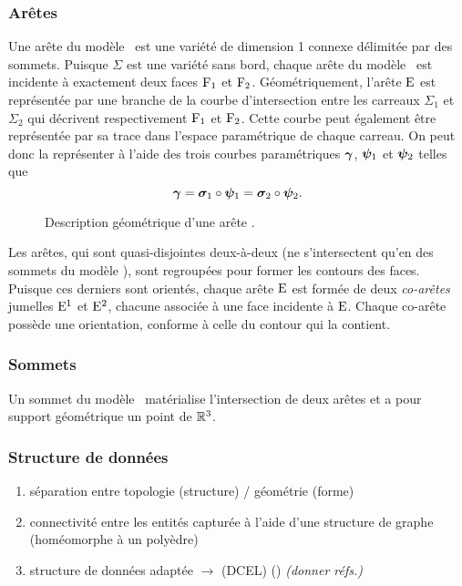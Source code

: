 \subsubsection{Arêtes}
\label{section:def_brep_edges}
Une arête du modèle \brep\ est une variété de dimension 1 connexe délimitée par des sommets.
Puisque $\Sigma$ est une variété sans bord, chaque arête du modèle \brep\ est incidente à exactement deux faces $\mathrm{F}_1$ et $\mathrm{F}_2$. 
Géométriquement, l'arête $\mathrm{E}$ est représentée par une branche de la courbe d'intersection entre les carreaux $\Sigma_1$ et $\Sigma_2$ qui décrivent respectivement $\mathrm{F}_1$ et $\mathrm{F}_2$. 
Cette courbe peut également être représentée par sa trace dans l'espace paramétrique de chaque carreau. 
On peut donc la représenter à l'aide des trois courbes paramétriques $\bm{\gamma}$, $\bm{\psi}_1$ et $\bm{\psi}_2$ telles que
\begin{equation}
	\bm{\gamma} = \bm{\sigma}_1 \circ \bm{\psi}_1 = \bm{\sigma}_2 \circ \bm{\psi}_2.
\end{equation}

\begin{figure}
	\centering
	
	\caption{Description géométrique d'une arête \brep.}
\end{figure}

Les arêtes, qui sont quasi-disjointes deux-à-deux (\ie ne s'intersectent qu'en des sommets du modèle \brep), sont regroupées pour former les contours des faces. 
Puisque ces derniers sont orientés, chaque arête $\mathrm{E}$ est formée de deux \textit{co-arêtes} jumelles $\mathrm{E}^1$ et $\mathrm{E}^2$, chacune associée à une face incidente à $\mathrm{E}$. 
Chaque co-arête possède une orientation, conforme à celle du contour qui la contient.


\subsubsection{Sommets}
\label{section:def_brep_vertices}
Un sommet du modèle \brep\ matérialise l'intersection de deux arêtes et a pour support géométrique un point de $\mathbb{R}^3$.

\subsubsection{Structure de données}
\begin{enumerate}
	\item séparation entre topologie (structure) / géométrie (forme)
	\item connectivité entre les entités capturée à l'aide d'une structure de graphe (homéomorphe à un polyèdre)
	\item structure de données adaptée $\to$  (DCEL) () \textit{(donner réfs.)}
\end{enumerate}

